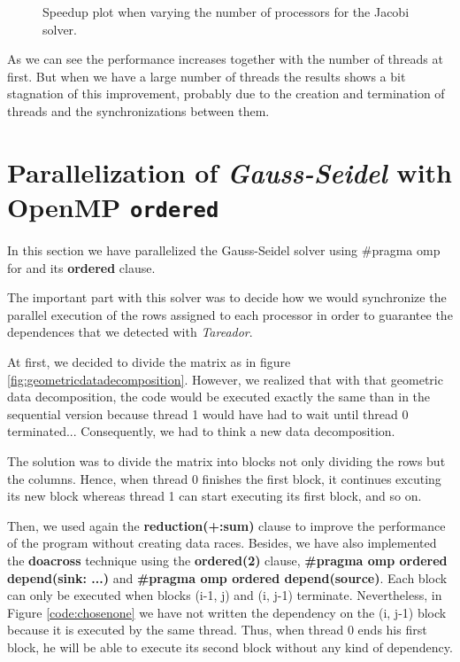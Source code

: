 \documentclass[12pt, a4paper]{article}
\begin{document}
\begin{figure}[H]
\begin{minipage}{0.4\linewidth}
  \caption{Speedup plot when varying the number of processors for the Jacobi solver.}
    \label{plot:speed-gauss}
\end{minipage}
\end{figure}

As we can see the performance increases together with the number of threads at first. But when we have a large number of threads the results shows a bit stagnation of this improvement, probably due to the creation and termination of threads and the synchronizations between them.

\section{Parallelization of \textit{Gauss-Seidel} with OpenMP \texttt{ordered}}

In this section we have parallelized the Gauss-Seidel solver using \#pragma omp for and its \textbf{ordered} clause.

The important part with this solver was to decide how we would synchronize the parallel execution of the rows assigned to each processor in order to guarantee the dependences that we detected with \textit{Tareador}.

At first, we decided to divide the matrix as in figure \ref{fig:geometricdatadecomposition}. However, we realized that with that geometric data decomposition, the code would be executed exactly the same than in the sequential version because thread 1 would have had to wait until thread 0 terminated... Consequently, we had to think a new data decomposition.

The solution was to divide the matrix into blocks not only dividing the rows but the columns. Hence, when thread 0 finishes the first block, it continues excuting its new block whereas thread 1 can start executing its first block, and so on.

Then, we used again the \textbf{reduction(+:sum)} clause to improve the performance of the program without creating data races. Besides, we have also implemented the \textbf{doacross} technique using the \textbf{ordered(2)} clause, \textbf{\#pragma omp ordered depend(sink: ...)} and \textbf{\#pragma omp ordered depend(source)}. Each block can only be executed when blocks (i-1, j) and (i, j-1) terminate. Nevertheless, in Figure \ref{code:chosenone} we have not written the dependency on the (i, j-1) block because it is executed by the same thread. Thus, when thread 0 ends his first block, he will be able to execute its second block without any kind of dependency.
\end{document}
